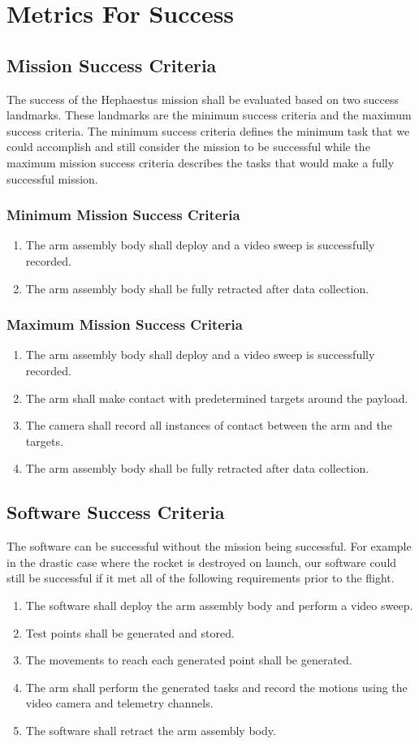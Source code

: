 \documentclass[letterpaper,10pt]{article}
\begin{document}
\section{Metrics For Success}
\subsection{Mission Success Criteria}
The success of the Hephaestus mission shall be evaluated based on two success
landmarks. These landmarks are the minimum success criteria and the maximum
success criteria. The minimum success criteria defines the minimum task that we
could accomplish and still consider the mission to be successful while the
maximum mission success criteria describes the tasks that would make a fully
successful mission.
\subsubsection{Minimum Mission Success Criteria}
\begin{enumerate}
  \item The arm assembly body shall deploy and a video sweep is successfully
    recorded.
  \item The arm assembly body shall be fully retracted after data collection.
\end{enumerate}
\subsubsection{Maximum Mission Success Criteria}
\begin{enumerate}
  \item The arm assembly body shall deploy and a video sweep is successfully
    recorded.
  \item The arm shall make contact with predetermined targets around the
    payload.
  \item The camera shall record all instances of contact between the arm and the
    targets.
  \item The arm assembly body shall be fully retracted after data collection.
\end{enumerate}
\subsection{Software Success Criteria}
The software can be successful without the mission being successful. For example
in the drastic case where the rocket is destroyed on launch, our software could
still be successful if it met all of the following requirements prior to the
flight.
\begin{enumerate}
  \item The software shall deploy the arm assembly body and perform a video sweep.
  \item Test points shall be generated and stored.
  \item The movements to reach each generated point shall be generated.
  \item The arm shall perform the generated tasks and record the motions using
    the video camera and telemetry channels.
  \item The software shall retract the arm assembly body.
\end{enumerate}
\end{document}
